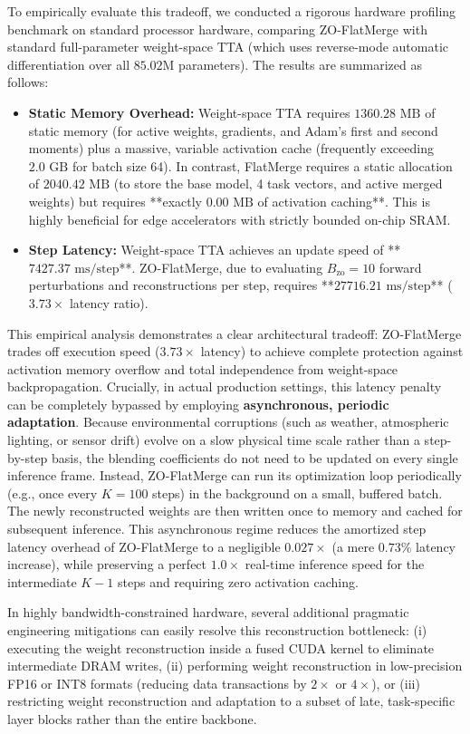 To empirically evaluate this tradeoff, we conducted a rigorous hardware profiling benchmark on standard processor hardware, comparing ZO-FlatMerge with standard full-parameter weight-space TTA (which uses reverse-mode automatic differentiation over all $85.02$M parameters). 
The results are summarized as follows:
\begin{itemize}
    \item \textbf{Static Memory Overhead:} Weight-space TTA requires $1360.28\text{ MB}$ of static memory (for active weights, gradients, and Adam's first and second moments) plus a massive, variable activation cache (frequently exceeding $2.0\text{ GB}$ for batch size 64). In contrast, FlatMerge requires a static allocation of $2040.42\text{ MB}$ (to store the base model, 4 task vectors, and active merged weights) but requires **exactly $0.00\text{ MB}$ of activation caching**. This is highly beneficial for edge accelerators with strictly bounded on-chip SRAM.
    \item \textbf{Step Latency:} Weight-space TTA achieves an update speed of **$7427.37\text{ ms/step}$**. ZO-FlatMerge, due to evaluating $B_{\text{zo}} = 10$ forward perturbations and reconstructions per step, requires **$27716.21\text{ ms/step}$** ($3.73\times$ latency ratio). 
\end{itemize}

This empirical analysis demonstrates a clear architectural tradeoff: ZO-FlatMerge trades off execution speed ($3.73\times$ latency) to achieve complete protection against activation memory overflow and total independence from weight-space backpropagation. 
Crucially, in actual production settings, this latency penalty can be completely bypassed by employing \textbf{asynchronous, periodic adaptation}. Because environmental corruptions (such as weather, atmospheric lighting, or sensor drift) evolve on a slow physical time scale rather than a step-by-step basis, the blending coefficients do not need to be updated on every single inference frame. Instead, ZO-FlatMerge can run its optimization loop periodically (e.g., once every $K = 100$ steps) in the background on a small, buffered batch. The newly reconstructed weights are then written once to memory and cached for subsequent inference. This asynchronous regime reduces the amortized step latency overhead of ZO-FlatMerge to a negligible \textbf{$0.027\times$} (a mere $0.73\%$ latency increase), while preserving a perfect $1.0\times$ real-time inference speed for the intermediate $K-1$ steps and requiring zero activation caching.

In highly bandwidth-constrained hardware, several additional pragmatic engineering mitigations can easily resolve this reconstruction bottleneck: (i) executing the weight reconstruction inside a fused CUDA kernel to eliminate intermediate DRAM writes, (ii) performing weight reconstruction in low-precision FP16 or INT8 formats (reducing data transactions by $2\times$ or $4\times$), or (iii) restricting weight reconstruction and adaptation to a subset of late, task-specific layer blocks rather than the entire backbone.


